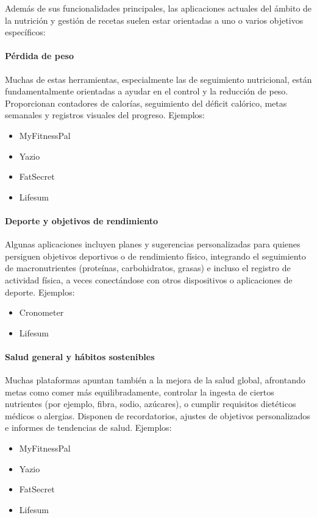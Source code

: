 Además de sus funcionalidades principales, las aplicaciones actuales del ámbito de la nutrición y gestión de recetas suelen estar orientadas a uno o varios objetivos específicos:

\paragraph*{Pérdida de peso}
Muchas de estas herramientas, especialmente las de seguimiento nutricional, están fundamentalmente orientadas a ayudar en el control y la reducción de peso. Proporcionan contadores de calorías, seguimiento del déficit calórico, metas semanales y registros visuales del progreso. Ejemplos:

\begin{itemize}
  \item MyFitnessPal
  \item Yazio
  \item FatSecret
  \item Lifesum
\end{itemize}

\paragraph*{Deporte y objetivos de rendimiento}
Algunas aplicaciones incluyen planes y sugerencias personalizadas para quienes persiguen objetivos deportivos o de rendimiento físico, integrando el seguimiento de macronutrientes (proteínas, carbohidratos, grasas) e incluso el registro de actividad física, a veces conectándose con otros dispositivos o aplicaciones de deporte. Ejemplos:

\begin{itemize}
  \item Cronometer
  \item Lifesum
\end{itemize}

\paragraph*{Salud general y hábitos sostenibles}
Muchas plataformas apuntan también a la mejora de la salud global, afrontando metas como comer más equilibradamente, controlar la ingesta de ciertos nutrientes (por ejemplo, fibra, sodio, azúcares), o cumplir requisitos dietéticos médicos o alergias. Disponen de recordatorios, ajustes de objetivos personalizados e informes de tendencias de salud. Ejemplos:

\begin{itemize}
  \item MyFitnessPal
  \item Yazio
  \item FatSecret
  \item Lifesum
\end{itemize}

